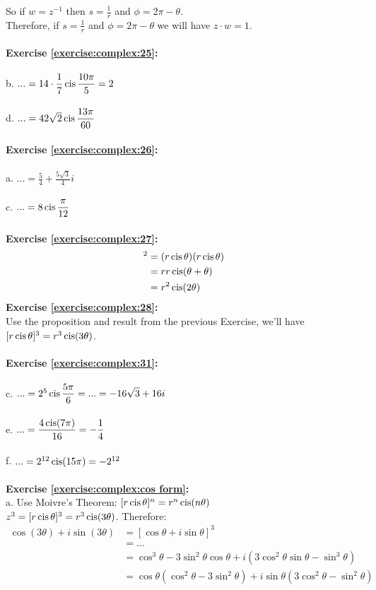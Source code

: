 So if $w=z^{-1}$ then $s=\displaystyle\frac{1}{r}$ and $\phi=2\pi-\theta$.\\
Therefore, if $s=\displaystyle\frac{1}{r}$ and $\phi=2\pi-\theta$ we will have $z\cdot w=1$.\\
\\
\textbf{Exercise \ref{exercise:complex:25}:}\\
\\
b. $...=14\cdot \displaystyle\frac{1}{7}\operatorname{cis}\frac{10\pi}{5}=2$\\
\\
d. $...=42\sqrt{2}\operatorname{cis}\displaystyle\frac{13\pi}{60}$\\
\\
\textbf{Exercise \ref{exercise:complex:26}:}\\
\\
a. $...=\displaystyle\frac{5}{4}+\frac{5\sqrt{3}}{4}i$\\
\\
c. $...=8\operatorname{cis}\displaystyle\frac{\pi}{12}$\\
\\
\textbf{Exercise \ref{exercise:complex:27}:}
\begin{align*}
[r\cis\theta]^{2} & = (r\cis\theta)(r\cis\theta)\\
& = rr\cis(\theta+\theta)\\
& = r^{2}\cis(2\theta)\\
\end{align*}
\textbf{Exercise \ref{exercise:complex:28}:}\\
Use the proposition and result from the previous Exercise, we'll have $[r\operatorname{cis}\theta]^{3}=r^{3}\operatorname{cis}(3\theta)$.\\
\\
\textbf{Exercise \ref{exercise:complex:31}:}\\
\\
c. $...=2^{5}\operatorname{cis}\displaystyle\frac{5\pi}{6}=...=-16\sqrt{3}+16i$\\
\\
e. $...=\displaystyle\frac{4\operatorname{cis}(7\pi)}{16}=-\frac{1}{4}$\\
\\
f. $...=2^{12}\operatorname{cis}(15\pi)=-2^{12}$\\
\\
\textbf{Exercise \ref{exercise:complex:cos form}:}\\
a. Use Moivre's Theorem: $[r\operatorname{cis}\theta]^{n}=r^{n}\operatorname{cis}(n\theta)$\\
$z^{3}=[r\operatorname{cis}\theta]^{3}=r^{3}\operatorname{cis}(3\theta)$. Therefore:
\begin{align*}
\cos(3\theta)+i\sin(3\theta) & =[\cos\theta+i\sin\theta]^{3}\\
& = ...\\
& = \cos^{3}\theta-3\sin^{2}\theta\cos\theta+i(3\cos^{2}\theta\sin\theta-\sin^{3}\theta)\\
& = \cos\theta(\cos^{2}\theta-3\sin^{2}\theta)+i\sin\theta(3\cos^{2}\theta-\sin^{2}\theta)\\
\end{align*}
